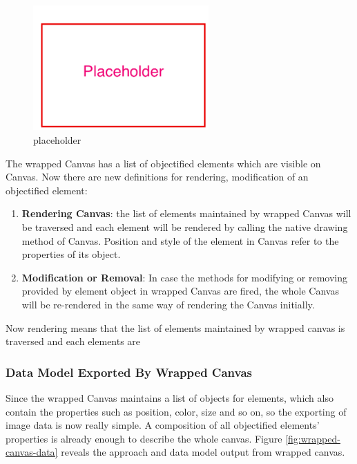 \begin{figure}[!htbp]
  \centering
    \includegraphics[width=0.6\textwidth]{Figures/placeholder.png}
  \caption{placeholder}
  \label{fig:wrapped-canvas}
\end{figure}
The wrapped Canvas has a list of objectified elements which are visible on Canvas. Now there are new definitions for rendering, modification of an objectified element:
\begin{enumerate}
\item
\textbf{Rendering Canvas}: the list of elements maintained by wrapped Canvas will be traversed and each element will be rendered by calling the native drawing method of Canvas. Position and style of the element in Canvas refer to the properties of its object.  
\item
\textbf{Modification or Removal}: In case the methods for modifying or removing provided by element object in wrapped Canvas are fired, the whole Canvas will be re-rendered in the same way of rendering the Canvas initially.

\end{enumerate}
Now rendering means that the list of elements maintained by wrapped canvas is traversed and each elements are 

\subsubsection{Data Model Exported By Wrapped Canvas}
Since the wrapped Canvas maintains a list of objects for elements, which also contain the properties such as position, color, size and so on, so the exporting of image data is now really simple. A composition of all objectified elements' properties is already enough to describe the whole canvas. Figure \ref{fig:wrapped-canvas-data} reveals the approach and data model output from wrapped 
canvas.


